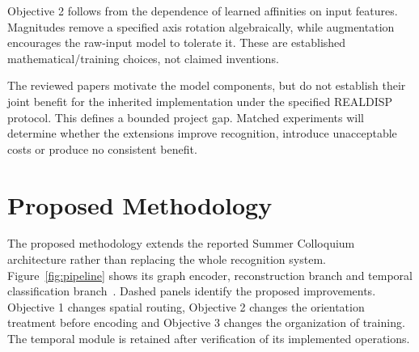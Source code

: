 \documentclass[10pt,a4paper,oneside,openany]{report}
\begin{document}
Objective 2 follows from the dependence of learned affinities on input features. Magnitudes remove a specified axis rotation algebraically, while augmentation encourages the raw-input model to tolerate it. These are established mathematical/training choices, not claimed inventions.

The reviewed papers motivate the model components, but do not establish their joint benefit for the inherited implementation under the specified REALDISP protocol. This defines a bounded project gap. Matched experiments will determine whether the extensions improve recognition, introduce unacceptable costs or produce no consistent benefit.

\cleardoublepage
\chapter{Proposed Methodology}
\label{chap:methodology}

The proposed methodology extends the reported Summer Colloquium architecture rather than replacing the whole recognition system. Figure~\ref{fig:pipeline} shows its graph encoder, reconstruction branch and temporal classification branch~\cite{summerreport}. Dashed panels identify the proposed improvements. Objective 1 changes spatial routing, Objective 2 changes the orientation treatment before encoding and Objective 3 changes the organization of training. The temporal module is retained after verification of its implemented operations.
\end{document}
